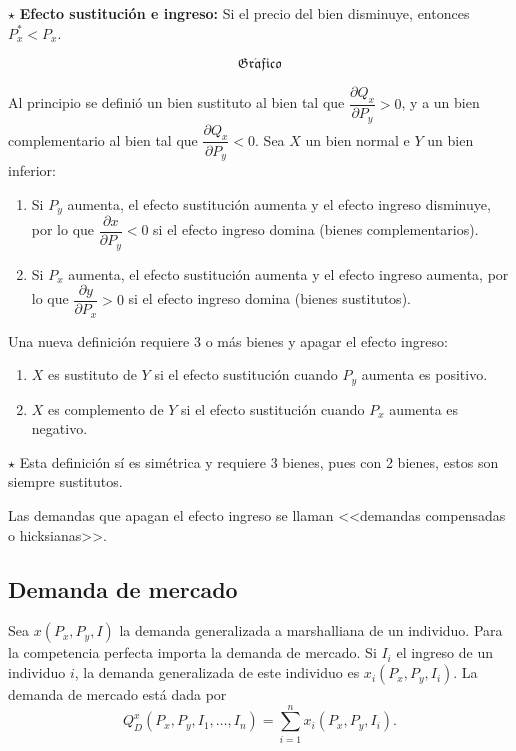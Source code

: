 \documentclass{report}
\newcommand{\GRAF}{\begin{center}$$\mathfrak{Gr\acute{a}fico}$$\end{center}}
\newenvironment{obs}{$\star$ }{}
\begin{document}
\begin{obs}
\textbf{Efecto sustitución e ingreso:} Si el precio del bien disminuye, entonces $P_x^*<P_x$.

\GRAF
\end{obs}

Al principio se definió un bien sustituto al bien tal que $\dfrac{\partial Q_x}{\partial P_y}>0$, y a un bien complementario al bien tal que $\dfrac{\partial Q_x}{\partial P_y}<0$. Sea $X$ un bien normal e $Y$ un bien inferior:
\begin{enumerate}
\item Si $P_y$ aumenta, el efecto sustitución aumenta y el efecto ingreso disminuye, por lo que $\dfrac{\partial x}{\partial P_y}<0$ si el efecto ingreso domina (bienes complementarios).
\item Si $P_x$ aumenta, el efecto sustitución aumenta y el efecto ingreso aumenta, por lo que $\dfrac{\partial y}{\partial P_x}>0$ si el efecto ingreso domina (bienes sustitutos).
\end{enumerate}

Una nueva definición requiere 3 o más bienes y apagar el efecto ingreso:
\begin{enumerate}
\item $X$ es sustituto de $Y$ si el efecto sustitución cuando $P_y$ aumenta es positivo.
\item $X$ es complemento de $Y$ si el efecto sustitución cuando $P_x$ aumenta es negativo.
\end{enumerate}

\begin{obs}
Esta definición sí es simétrica y requiere 3 bienes, pues con 2 bienes, estos son siempre sustitutos.
\end{obs}

Las demandas que apagan el efecto ingreso se llaman <<demandas compensadas o hicksianas>>.

\subsection{Demanda de mercado}

Sea $x\!\left(P_x,P_y,I\right)$ la demanda generalizada a marshalliana de un individuo. Para la competencia perfecta importa la demanda de mercado. Si $I_i$ el ingreso de un individuo $i$, la demanda generalizada de este individuo es $x_i\!\left(P_x,P_y,I_i\right)$. La demanda de mercado está dada por
$$Q_D^x\!\left(P_x,P_y,I_1,\ldots,I_n\right)=\sum_{i=1}^nx_i\!\left(P_x,P_y,I_i\right)\text{.}$$
\end{document}
